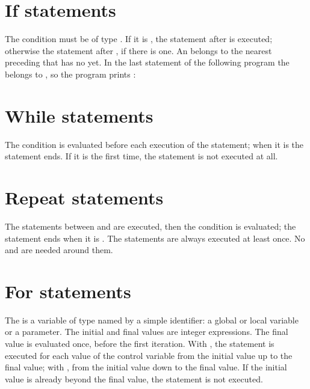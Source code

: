 

\section{If statements}

The condition must be of type .  If it is , the
statement after  is executed; otherwise the statement after
, if there is one.  An  belongs to the nearest preceding
 that has no  yet.  In the last statement of the
following program the  belongs to , so the
program prints :



\section{While statements}

The condition is evaluated before each execution of the statement; when it
is  the  statement ends.  If it is  the first
time, the statement is not executed at all.

\section{Repeat statements}

The statements between  and  are executed, then the
condition is evaluated; the  statement ends when it is
.  The statements are always executed at least once.  No
 and  are needed around them.

\section{For statements}

The  is a variable of type  named by a
simple identifier: a global or local variable or a parameter.  The initial
and final values are integer expressions.  The final value is evaluated
once, before the first iteration.  With , the statement is executed
for each value of the control variable from the initial value up to the
final value; with , from the initial value down to the final
value.  If the initial value is already beyond the final value, the
statement is not executed.

